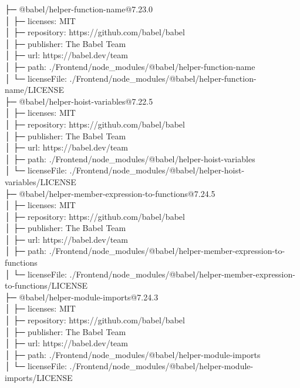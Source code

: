 \documentclass[
    paper=a4,
    twoside=false,
    parskip=half,
    listof=entryprefix,
    listof=totoc,
    index=totoc,
    bibliography=totoc,
    headsepline,
]{scrbook}
\begin{document}
    ├─ @babel/helper-function-name@7.23.0\\
    │  ├─ licenses: MIT\\
    │  ├─ repository: https://github.com/babel/babel\\
    │  ├─ publisher: The Babel Team\\
    │  ├─ url: https://babel.dev/team\\
    │  ├─ path: ./Frontend/node\_modules/@babel/helper-function-name\\
    │  └─ licenseFile: ./Frontend/node\_modules/@babel/helper-function-name/LICENSE\\
    ├─ @babel/helper-hoist-variables@7.22.5\\
    │  ├─ licenses: MIT\\
    │  ├─ repository: https://github.com/babel/babel\\
    │  ├─ publisher: The Babel Team\\
    │  ├─ url: https://babel.dev/team\\
    │  ├─ path: ./Frontend/node\_modules/@babel/helper-hoist-variables\\
    │  └─ licenseFile: ./Frontend/node\_modules/@babel/helper-hoist-variables/LICENSE\\
    ├─ @babel/helper-member-expression-to-functions@7.24.5\\
    │  ├─ licenses: MIT\\
    │  ├─ repository: https://github.com/babel/babel\\
    │  ├─ publisher: The Babel Team\\
    │  ├─ url: https://babel.dev/team\\
    │  ├─ path: ./Frontend/node\_modules/@babel/helper-member-expression-to-functions\\
    │  └─ licenseFile: ./Frontend/node\_modules/@babel/helper-member-expression-to-functions/LICENSE\\
    ├─ @babel/helper-module-imports@7.24.3\\
    │  ├─ licenses: MIT\\
    │  ├─ repository: https://github.com/babel/babel\\
    │  ├─ publisher: The Babel Team\\
    │  ├─ url: https://babel.dev/team\\
    │  ├─ path: ./Frontend/node\_modules/@babel/helper-module-imports\\
    │  └─ licenseFile: ./Frontend/node\_modules/@babel/helper-module-imports/LICENSE\\
\end{document}
